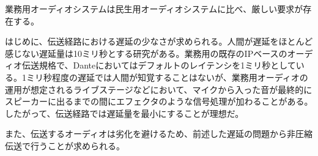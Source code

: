 業務用オーディオシステムは民生用オーディオシステムに比べ、厳しい要求が存在する。

はじめに、伝送経路における遅延の少なさが求められる。人間が遅延をほとんど感じない遅延量は10ミリ秒とする研究がある\cite{nagao-audio-latency}。業務用の既存のIPベースのオーディオ伝送規格で、Danteにおいてはデフォルトのレイテンシを1ミリ秒としている。1ミリ秒程度の遅延では人間が知覚することはないが、業務用オーディオの運用が想定されるライブステージなどにおいて、マイクから入った音が最終的にスピーカーに出るまでの間にエフェクタのような信号処理が加わることがある。したがって、伝送経路では遅延量を最小にすることが理想だ。

また、伝送するオーディオは劣化を避けるため、前述した遅延の問題から非圧縮伝送で行うことが求められる。
